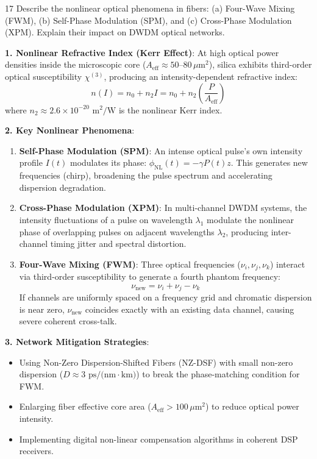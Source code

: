 \begin{theoryq}{17}
Describe the nonlinear optical phenomena in fibers: (a) Four-Wave Mixing (FWM), (b) Self-Phase Modulation (SPM), and (c) Cross-Phase Modulation (XPM). Explain their impact on DWDM optical networks.
\end{theoryq}
\begin{theorysol}
\textbf{1. Nonlinear Refractive Index (Kerr Effect)}:
At high optical power densities inside the microscopic core ($A_{\text{eff}} \approx 50\text{--}80\,\mu\text{m}^2$), silica exhibits third-order optical susceptibility $\chi^{(3)}$, producing an intensity-dependent refractive index:
\begin{equation}
n(I) = n_0 + n_2 I = n_0 + n_2 \left(\frac{P}{A_{\text{eff}}}\right)
\end{equation}
where $n_2 \approx 2.6 \times 10^{-20}\text{ m}^2/\text{W}$ is the nonlinear Kerr index.

\textbf{2. Key Nonlinear Phenomena}:
\begin{enumerate}
    \item \textbf{Self-Phase Modulation (SPM)}:
    An intense optical pulse's own intensity profile $I(t)$ modulates its phase: $\phi_{\text{NL}}(t) = -\gamma P(t) z$. This generates new frequencies (chirp), broadening the pulse spectrum and accelerating dispersion degradation.
    \item \textbf{Cross-Phase Modulation (XPM)}:
    In multi-channel DWDM systems, the intensity fluctuations of a pulse on wavelength $\lambda_1$ modulate the nonlinear phase of overlapping pulses on adjacent wavelengths $\lambda_2$, producing inter-channel timing jitter and spectral distortion.
    \item \textbf{Four-Wave Mixing (FWM)}:
    Three optical frequencies ($\nu_i, \nu_j, \nu_k$) interact via third-order susceptibility to generate a fourth phantom frequency:
    \begin{equation}
    \nu_{\text{new}} = \nu_i + \nu_j - \nu_k
    \end{equation}
    If channels are uniformly spaced on a frequency grid and chromatic dispersion is near zero, $\nu_{\text{new}}$ coincides exactly with an existing data channel, causing severe coherent cross-talk.
\end{enumerate}

\textbf{3. Network Mitigation Strategies}:
\begin{itemize}
    \item Using Non-Zero Dispersion-Shifted Fibers (NZ-DSF) with small non-zero dispersion ($D \approx 3\text{ ps/(nm}\cdot\text{km)}$) to break the phase-matching condition for FWM.
    \item Enlarging fiber effective core area ($A_{\text{eff}} > 100\,\mu\text{m}^2$) to reduce optical power intensity.
    \item Implementing digital non-linear compensation algorithms in coherent DSP receivers.
\end{itemize}
\end{theorysol}
\vspace{4mm}

